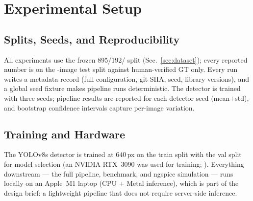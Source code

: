 \section{Experimental Setup}
\label{sec:setup}


\subsection{Splits, Seeds, and Reproducibility}
All experiments use the frozen 895/192/\NumTestImages{} split
(Sec.~\ref{sec:dataset}); every reported number is on the
\NumTestImages-image test split against human-verified GT only. Every
run writes a metadata record (full configuration, git SHA, seed,
library versions), and a global seed fixture makes pipeline runs
deterministic. The detector is trained with three seeds; pipeline
results are reported for each detector seed (mean$\pm$std), and
bootstrap confidence intervals capture per-image variation.

\subsection{Training and Hardware}
The YOLOv8s detector \cite{yolov8} is trained at $640$\,px on the
train split with the val split for model selection (an NVIDIA RTX~3090
was used for training; ). Everything downstream — the full pipeline, benchmark,
and ngspice simulation — runs locally on an Apple~M1 laptop (CPU +
Metal inference), which is part of the design brief: a lightweight
pipeline that does not require server-side inference.

